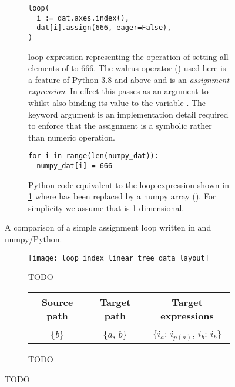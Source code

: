 \documentclass[thesis]{subfiles}
\begin{document}
\begin{figure}[h]
  \centering
  \begin{subfigure}[t]{.48\textwidth}
    \centering
    \begin{verbatim}
loop(
  i := dat.axes.index(),
  dat[i].assign(666, eager=False),
)
    \end{verbatim}
    \caption{
       loop expression representing the operation of setting all elements of  to 666.
      The walrus operator (\pycode{:=}) used here is a feature of Python 3.8 and above and is an \textit{assignment expression}.
      In effect this passes  as an argument to  whilst also binding its value to the variable .
      The keyword argument  is an implementation detail required to enforce that the assignment is a symbolic rather than numeric operation.
    }
    \label{fig:simple_loop_pyop3}
  \end{subfigure}
  \hfill
  \begin{subfigure}[t]{.48\textwidth}
    \centering
    \begin{verbatim}
for i in range(len(numpy_dat)):
  numpy_dat[i] = 666

    \end{verbatim}
    \caption{
      Python code equivalent to the loop expression shown in \ref{fig:simple_loop_pyop3} where  has been replaced by a numpy array ().
      For simplicity we assume that  is 1-dimensional.
    }
    \label{fig:simple_loop_python}
  \end{subfigure}

  \caption{A comparison of a simple assignment loop written in  and numpy/Python.}
  \label{fig:simple_loop}
\end{figure}

\begin{figure}[h]
  \centering
  \begin{subfigure}{\textwidth}
    \centering
    \texttt{[image: loop\_index\_linear\_tree\_data\_layout]}
    \caption{
      TODO
    }
    \label{fig:loop_index_linear_tree_data_layout}
  \end{subfigure}

  \vspace{1em}

  \begin{subfigure}{\textwidth}
    \centering
    \begin{tabular}{|c|c|c|}
      \hline
      \textbf{Source path} & \textbf{Target path} & \textbf{Target expressions} \\
      \hline
      \{$b$\} & \{$a$, $b$\} & \{$i_a$: $i_{p(a)}$, $i_b$: $i_b$\} \\
      \hline
    \end{tabular}
    \caption{
      TODO
    }
    \label{fig:loop_index_linear_tree_data_layout_exprs}
  \end{subfigure}

  \caption{
    TODO
  }
  \label{fig:loop_index_linear_tree_data_layout_all}
\end{figure}
\end{document}
